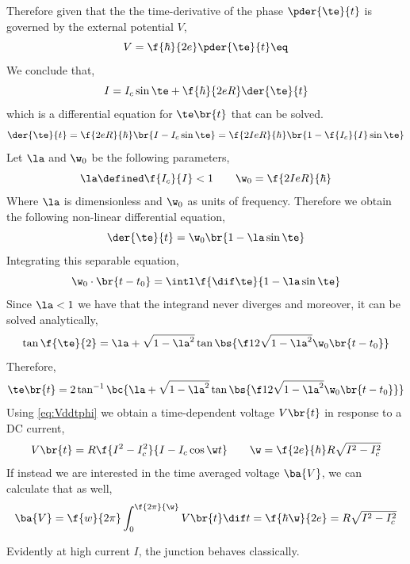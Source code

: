 \documentclass{article}
\begin{document}
Therefore given that the the time-derivative of the phase $\pder{\te}{t}$ is governed by the external potential $V$,
\[ V = \f{\hbar}{2e} \pder{\te}{t} \eq \label{eq:Vddtphi}\]
We conclude that,
\[ I = I_c \sin \te + \f{\hbar}{2 e R} \der{\te}{t} \]
which is a differential equation for $\te\br{t}$ that can be solved.
\[ \der{\te}{t} = \f{2eR}{\hbar}\br{I - I_c \sin \te} = \f{2 I e R}{\hbar} \br{1 - \f{I_c}{I}\sin \te} \]
Let $\la$ and $\w_{0}$ be the following parameters,
\[ \la \defined \f{I_c}{I} < 1 \qquad \w_0 = \f{2IeR}{\hbar}  \]
Where $\la$ is dimensionless and $\w_0$ as units of frequency. Therefore we obtain the following non-linear differential equation,
\[ \der{\te}{t} = \w_0\br{1 - \la \sin \te} \]
Integrating this separable equation,
\[ \w_0\cdot \br{t - t_0} = \intl \f{\dif \te}{1 - \la \sin \te} \]
Since $\la < 1$ we have that the integrand never diverges and moreover, it can be solved analytically,
\[ \tan \f{\te}{2} = \la + \sqrt{1 - \la^2} \tan\bs{\f12 \sqrt{1 -\la^2} \w_0 \br{t - t_0}} \]
Therefore,
\[ \te\br{t} = 2\tan^{-1}\bc{\la + \sqrt{1 - \la^2} \tan\bs{\f12 \sqrt{1 -\la^2} \w_0 \br{t - t_0}}} \]
Using \cref{eq:Vddtphi} we obtain a time-dependent voltage $V\br{t}$ in response to a DC current,
\[ V\br{t} = R \f{I^2 - I_c^2}{I - I_c \cos \w t} \qquad \w = \f{2e}{\hbar} R \sqrt{I^2 - I_c^2} \]
If instead we are interested in the time averaged voltage $\ba{V}$, we can calculate that as well,
\[ \ba{V} = \f{w}{2\pi}\int_{0}^{\f{2\pi}{\w}} V\br{t}\dif t = \f{\hbar \w}{2e} = R \sqrt{I^2 - I_c^2} \]
\begin{center}
\end{center}
Evidently at high current $I$, the junction behaves classically.
\end{document}
